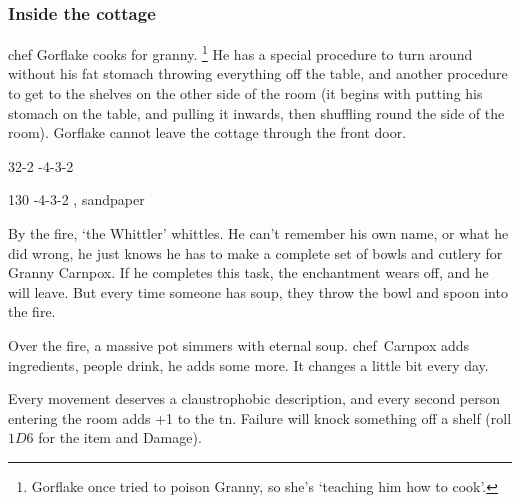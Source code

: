 \documentclass[10pt,twoside]{book}
\begin{document}
\subsubsection{Inside the cottage}
chef Gorflake cooks for granny.%
\footnote{Gorflake once tried to poison Granny, so she's `teaching him how to cook'.}
He has a special procedure to turn around without his fat stomach throwing everything off the table, and another procedure to get to the shelves on the other side of the room (it begins with putting his stomach on the table, and pulling it inwards, then shuffling round the side of the room).
Gorflake cannot leave the cottage through the front door.

%
  {{3}{2}{-2}}%
  {{-4}{-3}{-2}}%
  {%
  }%
  {}%
  {}%
  {}%

%
  {{1}{3}{0}}%
  {{-4}{-3}{-2}}%
  {%
    \Dagger
  }%
  {, \weaponmaster}%
  {sandpaper}%
  {}%

By the fire, `the Whittler' whittles.
He can't remember his own name, or what he did wrong, he just knows he has to make a complete set of bowls and cutlery for Granny Carnpox.
If he completes this task, the enchantment wears off, and he will leave.
But every time someone has soup, they throw the bowl and spoon into the fire.

Over the fire, a massive pot simmers with eternal soup.
\Gls{chef}~Carnpox adds ingredients, people drink, he adds some more.
It changes a little bit every day.


\def\name{}
Every movement deserves a claustrophobic description, and every second person entering the room adds +1 to the \gls{tn}.
Failure will knock something off a shelf (roll $1D6$ for the item and Damage).
\end{document}
